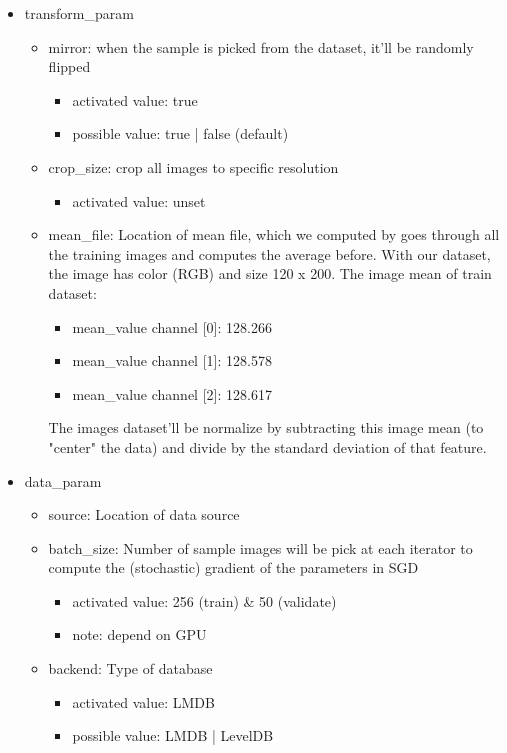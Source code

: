 \documentclass[11pt]{article}
\begin{document}
\begin{itemize}
	\item transform\_param
	\begin{itemize}
		\item mirror: when the sample is picked from the dataset, it'll be randomly flipped 
			\begin{itemize}
				\item activated value: true
				\item possible value: true | false (default)
			\end{itemize}
		\item crop\_size: crop all images to specific resolution
			\begin{itemize}
				\item activated value: unset
			\end{itemize}
		\item mean\_file: Location of mean file, which we computed by goes through all the training images and computes the average before.
		With our dataset, the image has color (RGB) and size 120 x 200. The image mean of train dataset:
		\begin{itemize}
			\item mean\_value channel [0]: 128.266
			\item mean\_value channel [1]: 128.578
			\item mean\_value channel [2]: 128.617
		\end{itemize}
		The images dataset'll be normalize by subtracting this image mean (to "center" the data) and divide by the standard deviation of that feature.
	\end{itemize}
	\item data\_param
	\begin{itemize}
		\item source: Location of data source
		\item batch\_size: Number of sample images will be pick at each iterator to compute the (stochastic) gradient of the parameters in SGD
			\begin{itemize}
				\item activated value: 256 (train) \& 50 (validate)
				\item note: depend on GPU
			\end{itemize}
		\item backend: Type of database
			\begin{itemize}
				\item activated value: LMDB
				\item possible value: LMDB | LevelDB
			\end{itemize}
	\end{itemize}
\end{itemize}
\newpage
\end{document}
